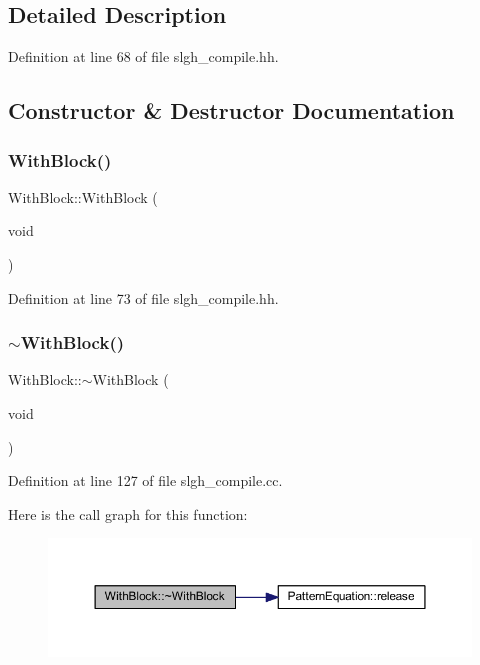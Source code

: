 \subsection{Detailed Description}


Definition at line 68 of file slgh\+\_\+compile.\+hh.



\subsection{Constructor \& Destructor Documentation}
\mbox{\label{class_with_block_a5067a3be282b8884e0bbad283cec72a7}} 
\subsubsection{\texorpdfstring{WithBlock()}{WithBlock()}}
{\footnotesize\ttfamily With\+Block\+::\+With\+Block (\begin{DoxyParamCaption}\item[{void}]{ }\end{DoxyParamCaption})\hspace{0.3cm}{\ttfamily [inline]}}



Definition at line 73 of file slgh\+\_\+compile.\+hh.

\mbox{\label{class_with_block_abe10370cfebc01730b24138bc86b6f54}} 
\subsubsection{\texorpdfstring{$\sim$WithBlock()}{~WithBlock()}}
{\footnotesize\ttfamily With\+Block\+::$\sim$\+With\+Block (\begin{DoxyParamCaption}\item[{void}]{ }\end{DoxyParamCaption})}



Definition at line 127 of file slgh\+\_\+compile.\+cc.

Here is the call graph for this function\+:
\nopagebreak
\begin{figure}[H]
\begin{center}
\leavevmode
\includegraphics[width=350pt]{class_with_block_abe10370cfebc01730b24138bc86b6f54_cgraph}
\end{center}
\end{figure}


